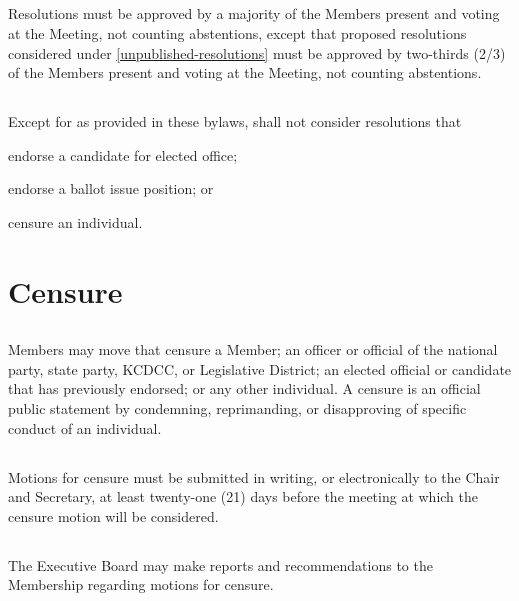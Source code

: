 \subsection{}
Resolutions must be approved by a majority of the Members present and voting at the Meeting, not counting abstentions, except that proposed resolutions considered under \autoref{unpublished-resolutions} must be approved by two-thirds (2/3) of the Members present and voting at the Meeting, not counting abstentions.

\subsection{}
Except for as provided in these bylaws, \thedistrict{} shall not consider resolutions that
\begin{inlinealphalist}
    \item endorse a candidate for elected office;
    \item endorse a ballot issue position; or
    \item censure an individual.
\end{inlinealphalist}

\section{Censure}
\subsection{}
Members may move that \thedistrict{} censure a Member; an officer or official of the national party, state party, KCDCC, or \fortythird{} Legislative District; an elected official or candidate that \thedistrict{} has previously endorsed; or any other individual. A censure is an official public statement by \thedistrict{} condemning, reprimanding, or disapproving of specific conduct of an individual.

\subsection{}
Motions for censure must be submitted in writing, or electronically to the Chair and Secretary, at least twenty-one (21) days before the meeting at which the censure motion will be considered.

\subsection{}
The Executive Board may make reports and recommendations to the Membership regarding motions for censure.

